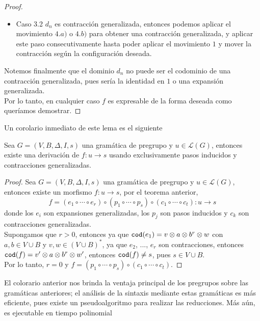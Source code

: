 \documentclass[../main.tex]{subfiles}
\begin{document}
\begin{proof}
\begin{itemize}
\begin{itemize}
                \item Caso 3.2 $d_n$ es contracción generalizada, entonces podemos aplicar el movimiento $4.a)$ o $4.b)$ para obtener una contracción generalizada, y aplicar este paso consecutivamente hasta poder aplicar el movimiento $1$ y mover la contracción según la configuración deseada.
            \end{itemize}
        \end{itemize}
        Notemos finalmente que el dominio $d_n$ no puede ser el codominio de una contracción generalizada, pues sería la identidad en $1$ o una expansión generalizada. \\
        Por lo tanto, en cualquier caso $f$ es expresable de la forma deseada como queríamos demostrar. 
    \end{proof}
    Un corolario inmediato de este lema es el siguiente
    \begin{cor}
        Sea $G=(V,B, \Delta,I,s)$ una gramática de pregrupo y $u \in \mathcal{L}(G)$, entonces existe una derivación de $f:u \to s$ usando exclusivamente pasos inducidos y contracciones generalizadas.
        
    \end{cor}
    \begin{proof}
        Sea $G=(V,B, \Delta,I,s)$ una gramática de pregrupo y $u \in \mathcal{L}(G)$, entonces existe un morfismo $f:u \to s$, por el teorema anterior, 
         $$f= (e_1 \circ \cdots \circ e_r) \circ (p_1 \circ \cdots \circ p_s) \circ (c_1 \circ \cdots \circ c_t): u \to s$$
        donde los $e_i$ son expansiones generalizadas, los $p_j$ son pasos inducidos y $c_k$ son contracciones generalizadas. \\
        Supongamos que $r>0$, entonces ya que $\texttt{cod}(e_1)=v\otimes a \otimes b^r \otimes w$ con $a,b \in V \cup B$ y $v,w \in (V \cup B)^*$, ya que $e_2$, ..., $e_r$ son contracciones, entonces $\texttt{cod}(f)=v' \otimes a \otimes b^r \otimes w'$, entonces $\texttt{cod} (f) \neq s$, pues $s \in V \cup B$. \\
        Por lo tanto, $r=0$ y $f=(p_1 \circ \cdots \circ p_s) \circ (c_1 \circ \cdots \circ c_t)$.
    \end{proof}
    El colorario anterior nos brinda la ventaja principal de los pregrupos sobre las gramáticas anteriores; el análisis de la sintaxis mediante estas gramáticas es más eficiente, pues existe un pseudoalgoritmo para realizar las reducciones. Más aún, es ejecutable en tiempo polinomial \cite{Degeilh2005} 
\end{document}
